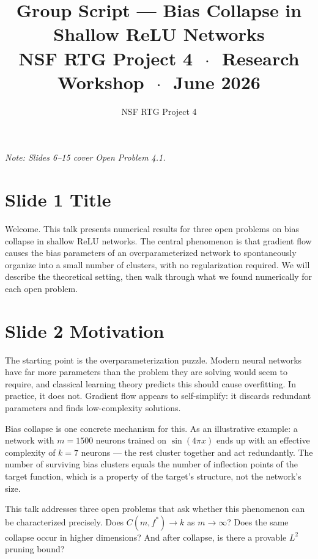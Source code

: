 \documentclass[11pt]{article}
\title{\textbf{Group Script --- Bias Collapse in Shallow ReLU Networks}\\
       \large NSF RTG Project 4 $\,\cdot\,$ Research Workshop $\,\cdot\,$ June 2026}
\author{NSF RTG Project 4}
\date{}
\begin{document}
\maketitle
\thispagestyle{empty}

{\small\textit{Note: Slides 6--15 cover Open Problem 4.1.}}

\section*{Slide 1 \quad Title}

Welcome. This talk presents numerical results for three open problems on bias collapse in shallow ReLU networks.
The central phenomenon is that gradient flow causes the bias parameters of an overparameterized network to spontaneously organize into a small number of clusters, with no regularization required.
We will describe the theoretical setting, then walk through what we found numerically for each open problem.

\section*{Slide 2 \quad Motivation}

The starting point is the overparameterization puzzle.
Modern neural networks have far more parameters than the problem they are solving would seem to require, and classical learning theory predicts this should cause overfitting.
In practice, it does not.
Gradient flow appears to self-simplify: it discards redundant parameters and finds low-complexity solutions.

Bias collapse is one concrete mechanism for this.
As an illustrative example: a network with $m = 1500$ neurons trained on $\sin(4\pi x)$ ends up with an effective complexity of $k = 7$ neurons --- the rest cluster together and act redundantly.
The number of surviving bias clusters equals the number of inflection points of the target function, which is a property of the target's structure, not the network's size.

This talk addresses three open problems that ask whether this phenomenon can be characterized precisely.
Does $C(m, f^*) \to k$ as $m \to \infty$?
Does the same collapse occur in higher dimensions?
And after collapse, is there a provable $L^2$ pruning bound?

\end{document}
